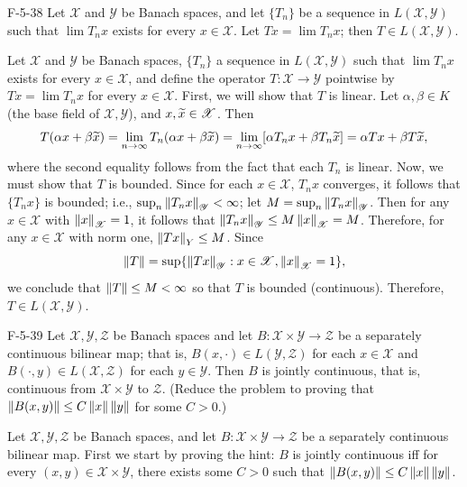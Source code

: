 \documentclass{article}
\begin{document}
	\begin{prb}{F-5-38}
		Let $\mathscr{X}$ and $\mathscr{Y}$ be Banach spaces, and let $\{T_{n}\}$ be a sequence in $L(\mathscr{X}, \mathscr{Y})$ such that $\lim T_{n}x$ exists for every $x \in \mathscr{X}$. Let $Tx = \lim T_{n}x$; then $T \in L(\mathscr{X}, \mathscr{Y})$. 
	\end{prb}
	Let $\mathscr{X}$ and $\mathscr{Y}$ be Banach spaces, $\{T_{n}\}$ a sequence in $L(\mathscr{X}, \mathscr{Y})$ such that $\lim T_{n}x$ exists for every $x \in \mathscr{X}$, and define the operator $T: \mathscr{X} \to \mathscr{Y}$ pointwise by $Tx = \lim T_{n}x$ for every $x \in \mathscr{X}$. First, we will show that $T$ is linear. Let $\alpha, \beta \in K$ (the base field of $\mathscr{X}, \mathscr{Y}$), and $x, \widetilde{x} \in \mathscr{X}$. Then 
	\begin{align*}
		\begin{split}
			T(\alpha x + \beta \widetilde{x}) = \lim_{n \to \infty}T_{n}(\alpha x + \beta \widetilde{x}) = \lim_{n \to \infty}[\alpha T_{n}x + \beta T_{n}\widetilde{x}] = \alpha Tx + \beta T\widetilde{x}, 
		\end{split} 
	\end{align*}
	where the second equality follows from the fact that each $T_{n}$ is linear. Now, we must show that $T$ is bounded. Since for each $x \in \mathscr{X}$, $T_{n}x$ converges, it follows that $\{T_{n}x\}$ is bounded; i.e., $\sup_{n}\left\Vert T_{n}x \right\Vert_{\mathscr Y} < \infty$; let $M = \sup_{n}\left\Vert T_{n}x \right\Vert_{\mathscr Y}$. Then for any $x \in \mathscr{X}$ with $\left\Vert x \right\Vert_{\mathscr{X}} = 1$, it follows that $\left\Vert T_{n}x \right\Vert_{\mathscr{Y}} \leq M\left\Vert x \right\Vert_{\mathscr{X}} = M$. Therefore, for any $x \in \mathscr{X}$ with norm one, $\left\Vert Tx \right\Vert_{Y} \leq M$. Since 
	\begin{equation*}
		\left\Vert T \right\Vert = \sup\{\left\Vert Tx \right\Vert_{\mathscr{Y}}: x \in \mathscr{X}, \left\Vert x \right\Vert_{\mathscr{X}} = 1\}, 
	\end{equation*}
	we conclude that $\left\Vert T \right\Vert \leq M < \infty$ so that $T$ is bounded (continuous). Therefore, $T \in L(\mathscr{X}, \mathscr{Y})$. 
	
	
	\begin{prb}{F-5-39}
		Let $\mathscr{X}, \mathscr{Y}, \mathscr{Z}$ be Banach spaces and let $B: \mathscr{X} \times \mathscr{Y} \to \mathscr{Z}$ be a separately continuous bilinear map; that is, $B(x, \cdot) \in L(\mathscr{Y}, \mathscr{Z})$ for each $x \in \mathscr{X}$ and $B(\cdot, y) \in L(\mathscr{X}, \mathscr{Z})$ for each $y \in \mathscr{Y}$. Then $B$ is jointly continuous, that is, continuous from $\mathscr{X} \times \mathscr{Y}$ to $\mathscr{Z}$. (Reduce the problem to proving that $\left\Vert B(x, y) \right\Vert \leq C\left\Vert x \right\Vert\left\Vert y \right\Vert$ for some $C > 0$.)
	\end{prb}
	Let $\mathscr{X}, \mathscr{Y}, \mathscr{Z}$ be Banach spaces, and let $B: \mathscr{X} \times \mathscr{Y} \to\mathscr{Z}$ be a separately continuous bilinear map. First we start by proving the hint: $B$ is jointly continuous iff for every $(x, y) \in \mathscr{X} \times \mathscr{Y}$, there exists some $C > 0$ such that $\left\Vert B(x, y) \right\Vert \leq C\left\Vert x \right\Vert\left\Vert y \right\Vert$. 
	
\end{document}
